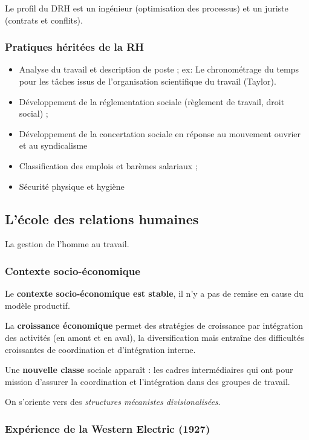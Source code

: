 \documentclass[12pt]{article}
\begin{document}
	  Le profil du DRH est un ingénieur (optimisation des processus) et un juriste (contrats et conflits).
	  
	  \subsubsection{Pratiques héritées de la RH}
	  
	  \begin{itemize}
	   \item Analyse du travail et description de poste ; \newline
	   ex: Le chronométrage du temps pour les tâches issus de l'organisation scientifique du travail (Taylor).
	   \item Développement de la réglementation sociale (règlement de travail, droit social) ;
	   \item Développement de la concertation sociale en réponse au mouvement ouvrier et au syndicalisme
	   \item Classification des emplois et barèmes salariaux ;
	   \item Sécurité physique et hygiène
	  \end{itemize}

	\subsection{L'école des relations humaines}
	La gestion de l'homme au travail.
	  \subsubsection{Contexte socio-économique}
	  
	  Le \textbf{contexte socio-économique est stable}, il n'y a pas de remise en cause du modèle productif.
	  
	  La \textbf{croissance économique} permet des stratégies de croissance par intégration des activités (en amont et en aval), la diversification mais entraîne des difficultés croissantes de coordination et d'intégration interne.
	  
	  Une \textbf{nouvelle classe} sociale apparaît : les cadres intermédiaires qui ont pour mission d'assurer la coordination et l'intégration dans des groupes de travail.
	  
	  On s'oriente vers des \emph{structures mécanistes divisionalisées}.
	  
	  \subsubsection{Expérience de la Western Electric (1927)}
	  
\end{document}
